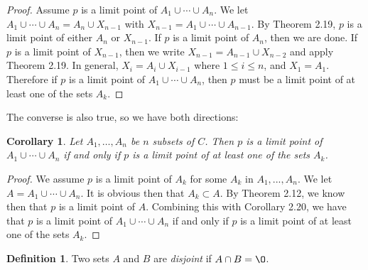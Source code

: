 \documentclass[12pt]{article}
\renewcommand{\emptyset}{\O}
\renewcommand{\_}[1]{\underline{ #1 }}
\newtheorem{corollary}[theorem]{Corollary}
\theoremstyle{definition}
\newtheorem{definition}[theorem]{Definition}
\numberwithin{equation}{subsection}
\begin{document}
\begin{proof}
Assume $p$ is a limit point of $A_1 \cup \dotsm \cup A_n$. We let $A_1 \cup \dotsm \cup A_n = A_n \cup X_{n-1}$ with $X_{n-1} = A_1 \cup \dotsm \cup A_{n-1}$. By Theorem 2.19, $p$ is a limit point of either $A_n$ or $X_{n-1}$. If $p$ is a limit point of $A_n$, then we are done. If $p$ is a limit point of $X_{n-1}$, then we write $X_{n-1} = A_{n-1} \cup X_{n-2}$ and apply Theorem 2.19. In general, $X_i = A_i \cup X_{i-1}$ where $1 \leq i \leq n$, and $X_1 = A_1$. Therefore if $p$ is a limit point of $A_1 \cup \dotsm \cup A_n$, then $p$ must be a limit point of at least one of the sets $A_k$.
\end{proof}

The converse is also true, so we have both directions:

\begin{corollary}
Let $A_1, \dotsc, A_n$ be $n$ subsets of $C$.  Then $p$ is a limit point of $A_1 \cup \dotsm \cup A_n$ if and only if $p$ is a limit point of at least one of the sets $A_k$.
\end{corollary}

\begin{proof}
We assume $p$ is a limit point of $A_k$ for some $A_k$ in $A_1,...,A_n$. We let $A = A_1 \cup \dotsm \cup A_n$. It is obvious then that $A_k \subset A$. By Theorem 2.12, we know then that $p$ is a limit point of $A$. Combining this with Corollary 2.20, we have that $p$ is a limit point of $A_1 \cup \dotsm \cup A_n$ if and only if $p$ is a limit point of at least one of the sets $A_k$.
\end{proof}

\begin{definition}  Two sets $A$ and $B$ are \emph{disjoint} if $A \cap B = \emptyset$. 
\end{definition}
\end{document}
